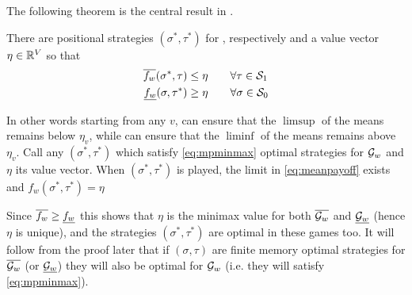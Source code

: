 The following theorem is the central result in \cite{ehrenfeucht_positional_1979}.

\begin{theorem}
    \label{thm:posMeanPayoff}
    There are positional strategies $(\sigma^*,\tau^*)$ for ,  respectively and a value vector $\eta \in \mathbb{R}^V$ so that
    \begin{equation}
        \label{eq:mpminmax}
        \begin{aligned}
            \overline{f_w}(\sigma^*,\tau) &\leq \eta \qquad \forall \tau \in \mathcal{S}_1\\
            \underline{f_w}(\sigma,\tau^*) &\geq \eta \qquad \forall \sigma \in \mathcal{S}_0
        \end{aligned}
    \end{equation}
\end{theorem}

In other words starting from any $v$,  can ensure that the $\limsup$ of the means remains below $\eta_v$, while  can ensure that the $\liminf$ of the means remains above $\eta_v$. Call any $(\sigma^*,\tau^*)$ which satisfy \eqref{eq:mpminmax} optimal strategies for $\mathcal{G}_w$ and $\eta$ its value vector. When $(\sigma^*,\tau^*)$ is played, the limit in \eqref{eq:meanpayoff} exists and $f_w(\sigma^*,\tau^*)=\eta$

Since $\overline{f_w} \geq \underline{f_w}$ this shows that $\eta$ is the minimax value for both $\overline{\mathcal{G}_w}$ and $\underline{\mathcal{G}_w}$ (hence $\eta$ is unique), and the strategies $(\sigma^*,\tau^*)$ are optimal in these games too. It will follow from the proof later that if $(\sigma,\tau)$ are finite memory optimal strategies for $\overline{\mathcal{G}_w}$ (or $\underline{\mathcal{G}_w}$) they will also be optimal for $\mathcal{G}_w$ (i.e. they will satisfy \eqref{eq:mpminmax}).\\

